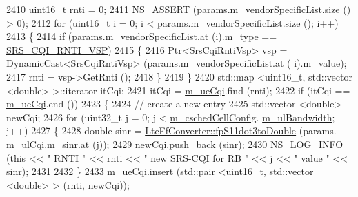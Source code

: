\begin{DoxyCode}
2410         uint16\_t rnti = 0;
2411         \hyperlink{assert_8h_a6dccdb0de9b252f60088ce281c49d052}{NS\_ASSERT} (params.m\_vendorSpecificList.size () > 0);
2412         \textcolor{keywordflow}{for} (uint16\_t \hyperlink{bernuolliDistribution_8m_a6f6ccfcf58b31cb6412107d9d5281426}{i} = 0; \hyperlink{bernuolliDistribution_8m_a6f6ccfcf58b31cb6412107d9d5281426}{i} < params.m\_vendorSpecificList.size (); \hyperlink{bernuolliDistribution_8m_a6f6ccfcf58b31cb6412107d9d5281426}{i}++)
2413           \{
2414             \textcolor{keywordflow}{if} (params.m\_vendorSpecificList.at (\hyperlink{bernuolliDistribution_8m_a6f6ccfcf58b31cb6412107d9d5281426}{i}).m\_type == \hyperlink{lte-vendor-specific-parameters_8h_a3b5e6e766032ab4a8e374a1cfd237a26}{SRS\_CQI\_RNTI\_VSP})
2415               \{
2416                 Ptr<SrsCqiRntiVsp> vsp = DynamicCast<SrsCqiRntiVsp> (params.m\_vendorSpecificList.at (
      \hyperlink{bernuolliDistribution_8m_a6f6ccfcf58b31cb6412107d9d5281426}{i}).m\_value);
2417                 rnti = vsp->GetRnti ();
2418               \}
2419           \}
2420         std::map <uint16\_t, std::vector <double> >::iterator itCqi;
2421         itCqi = \hyperlink{classns3_1_1CqaFfMacScheduler_a263024e4342a26bfc2fabd0697da8641}{m\_ueCqi}.find (rnti);
2422         \textcolor{keywordflow}{if} (itCqi == \hyperlink{classns3_1_1CqaFfMacScheduler_a263024e4342a26bfc2fabd0697da8641}{m\_ueCqi}.end ())
2423           \{
2424             \textcolor{comment}{// create a new entry}
2425             std::vector <double> newCqi;
2426             \textcolor{keywordflow}{for} (uint32\_t j = 0; j < \hyperlink{classns3_1_1CqaFfMacScheduler_ad5dc768ca3a3c71671fd64de7de8ec00}{m\_cschedCellConfig}.
      \hyperlink{structns3_1_1FfMacCschedSapProvider_1_1CschedCellConfigReqParameters_a5ab5b102878e6e7e7727a14af4a64d2f}{m\_ulBandwidth}; j++)
2427               \{
2428                 \textcolor{keywordtype}{double} sinr = \hyperlink{classns3_1_1LteFfConverter_aa5d8c2a8f988dbd63da91818c18666eb}{LteFfConverter::fpS11dot3toDouble} (params.
      m\_ulCqi.m\_sinr.at (j));
2429                 newCqi.push\_back (sinr);
2430                 \hyperlink{group__logging_gafbd73ee2cf9f26b319f49086d8e860fb}{NS\_LOG\_INFO} (\textcolor{keyword}{this} << \textcolor{stringliteral}{" RNTI "} << rnti << \textcolor{stringliteral}{" new SRS-CQI for RB  "} << j << \textcolor{stringliteral}{" value
       "} << sinr);
2431 
2432               \}
2433             \hyperlink{classns3_1_1CqaFfMacScheduler_a263024e4342a26bfc2fabd0697da8641}{m\_ueCqi}.insert (std::pair <uint16\_t, std::vector <double> > (rnti, newCqi));

\end{DoxyCode}

